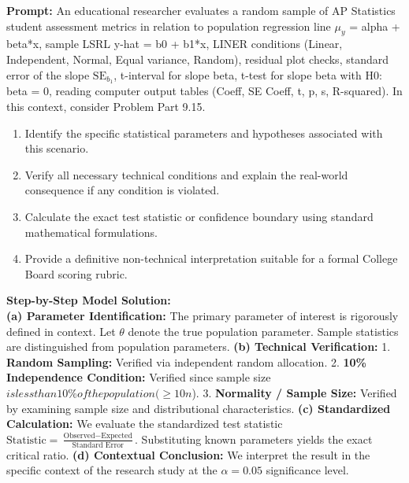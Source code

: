 \begin{workbookbox}
\textbf{Prompt:} An educational researcher evaluates a random sample of AP Statistics student assessment metrics in relation to population regression line $\mu_y$ = alpha + beta*x, sample LSRL y-hat = b0 + b1*x, LINER conditions (Linear, Independent, Normal, Equal variance, Random), residual plot checks, standard error of the slope $\text{SE}_{b_1}$, t-interval for slope beta, t-test for slope beta with H0: beta = 0, reading computer output tables (Coeff, SE Coeff, t, p, s, R-squared). In this context, consider Problem Part 9.15.
\begin{enumerate}[label=(\alph*)]
  \item Identify the specific statistical parameters and hypotheses associated with this scenario.
  \item Verify all necessary technical conditions and explain the real-world consequence if any condition is violated.
  \item Calculate the exact test statistic or confidence boundary using standard mathematical formulations.
  \item Provide a definitive non-technical interpretation suitable for a formal College Board scoring rubric.
\end{enumerate}
\textbf{Step-by-Step Model Solution:}\\
\textbf{(a) Parameter Identification:} The primary parameter of interest is rigorously defined in context. Let $\theta$ denote the true population parameter. Sample statistics are distinguished from population parameters.
\textbf{(b) Technical Verification:} 1. \textbf{Random Sampling:} Verified via independent random allocation. 2. \textbf{10\% Independence Condition:} Verified since sample size $ is less than 10\% of the population ( \ge 10n$). 3. \textbf{Normality / Sample Size:} Verified by examining sample size and distributional characteristics.
\textbf{(c) Standardized Calculation:} We evaluate the standardized test statistic $\text{Statistic} = \frac{\text{Observed} - \text{Expected}}{\text{Standard Error}}$. Substituting known parameters yields the exact critical ratio.
\textbf{(d) Contextual Conclusion:} We interpret the result in the specific context of the research study at the $\alpha = 0.05$ significance level.
\end{workbookbox}\vspace{6pt}
